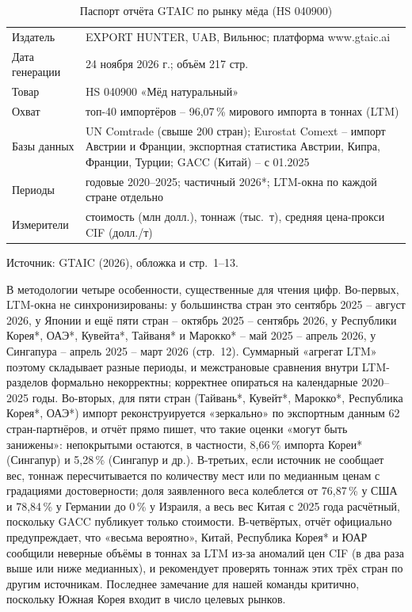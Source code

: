 \documentclass[11pt,a4paper]{article}
\begin{document}
\begin{table}[h]
\centering
\small
\caption{Паспорт отчёта GTAIC по рынку мёда (HS 040900)}
\begin{tabular}{p{4.2cm}p{11.2cm}}
\toprule
Издатель & EXPORT HUNTER, UAB, Вильнюс; платформа www.gtaic.ai \\
Дата генерации & 24 ноября 2026 г.; объём 217 стр. \\
Товар & HS 040900 «Мёд натуральный» \\
Охват & топ-40 импортёров -- 96{,}07\,\% мирового импорта в тоннах (LTM) \\
Базы данных & UN Comtrade (свыше 200 стран); Eurostat Comext -- импорт Австрии и Франции,
экспортная статистика Австрии, Кипра, Франции, Турции; GACC (Китай) -- с 01.2025 \\
Периоды & годовые 2020--2025; частичный 2026*; LTM-окна по каждой стране отдельно \\
Измерители & стоимость (млн долл.), тоннаж (тыс.~т), средняя цена-прокси CIF (долл./т) \\
\bottomrule
\end{tabular}

\noindent Источник: GTAIC (2026), обложка и стр.~1--13.
\end{table}

В методологии четыре особенности, существенные для чтения цифр. Во-первых, LTM-окна
не синхронизированы: у большинства стран это сентябрь 2025 -- август 2026, у Японии и ещё
пяти стран -- октябрь 2025 -- сентябрь 2026, у Республики Корея*, ОАЭ*, Кувейта*, Тайваня*
и Марокко* -- май 2025 -- апрель 2026, у Сингапура -- апрель 2025 -- март 2026 (стр.~12).
Суммарный «агрегат LTM» поэтому складывает разные периоды, и межстрановые сравнения внутри
LTM-разделов формально некорректны; корректнее опираться на календарные 2020--2025 годы.
Во-вторых, для пяти стран (Тайвань*, Кувейт*, Марокко*, Республика Корея*, ОАЭ*) импорт
реконструируется «зеркально» по экспортным данным 62 стран-партнёров, и отчёт прямо пишет,
что такие оценки «могут быть занижены»: непокрытыми остаются, в частности, 8{,}66\,\%
импорта Кореи* (Сингапур) и 5{,}28\,\% (Сингапур и др.). В-третьих, если источник не сообщает
вес, тоннаж пересчитывается по количеству мест или по медианным ценам с градациями
достоверности; доля заявленного веса колеблется от 76{,}87\,\% у США и 78{,}84\,\% у Германии
до 0\,\% у Израиля, а весь вес Китая с 2025 года расчётный, поскольку GACC публикует только
стоимости. В-четвёртых, отчёт официально предупреждает, что «весьма вероятно», Китай,
Республика Корея* и ЮАР сообщили неверные объёмы в тоннах за LTM из-за аномалий цен CIF
(в два раза выше или ниже медианных), и рекомендует проверять тоннаж этих трёх стран по другим
источникам. Последнее замечание для нашей команды критично, поскольку Южная Корея входит
в число целевых рынков.
\end{document}
